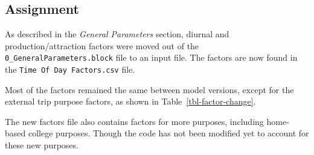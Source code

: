 \documentclass[
  letterpaper,
  DIV=11,
  numbers=noendperiod,
  titlepage=false]{scrreprt}
\begin{document}
\newpage

\hypertarget{assignment}{%
\subsection{Assignment}\label{assignment}}

As described in the \emph{General Parameters} section, diurnal and
production/attraction factors were moved out of the
\texttt{0\_GeneralParameters.block} file to an input file. The factors
are now found in the \texttt{Time\ Of\ Day\ Factors.csv} file.

Most of the factors remained the same between model versions, except for
the external trip purpose factors, as shown in
Table~\ref{tbl-factor-change}.

The new factors file also contains factors for more purposes, including
home-based college purposes. Though the code has not been modified yet
to account for these new purposes.
\end{document}

